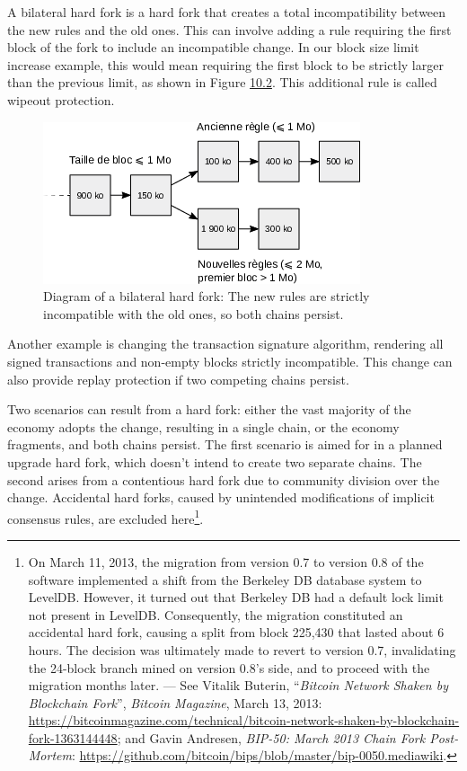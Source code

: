 \documentclass[
  a5paper,
  smalldemyvopaper,10pt,twoside,onecolumn,openright,extrafontsizes,hidelinks]{memoir}
\begin{document}
A bilateral hard fork is a hard fork that creates a total
incompatibility between the new rules and the old ones. This can involve
adding a rule requiring the first block of the fork to include an
incompatible change. In our block size limit increase example, this
would mean requiring the first block to be strictly larger than the
previous limit, as shown in Figure
\hyperref[fig:expanding-hard-fork-failure]{10.2}. This additional rule
is called wipeout protection.

\begin{figure}

{\centering \includegraphics{chapters/img/bilateral-hard-fork-induced-fork.png}

}

\caption{Diagram of a bilateral hard fork: The new rules are strictly
incompatible with the old ones, so both chains persist.}

\end{figure}%

Another example is changing the transaction signature algorithm,
rendering all signed transactions and non-empty blocks strictly
incompatible. This change can also provide replay protection if two
competing chains persist.

Two scenarios can result from a hard fork: either the vast majority of
the economy adopts the change, resulting in a single chain, or the
economy fragments, and both chains persist. The first scenario is aimed
for in a planned upgrade hard fork, which doesn't intend to create two
separate chains. The second arises from a contentious hard fork due to
community division over the change. Accidental hard forks, caused by
unintended modifications of implicit consensus rules, are excluded
here\footnote{On March 11, 2013, the migration from version 0.7 to
  version 0.8 of the software implemented a shift from the Berkeley DB
  database system to LevelDB. However, it turned out that Berkeley DB
  had a default lock limit not present in LevelDB. Consequently, the
  migration constituted an accidental hard fork, causing a split from
  block 225,430 that lasted about 6 hours. The decision was ultimately
  made to revert to version 0.7, invalidating the 24-block branch mined
  on version 0.8's side, and to proceed with the migration months later.
  --- See Vitalik Buterin, ``\emph{Bitcoin Network Shaken by Blockchain
  Fork}'', \emph{Bitcoin Magazine}, March 13, 2013:
  \url{https://bitcoinmagazine.com/technical/bitcoin-network-shaken-by-blockchain-fork-1363144448};
  and Gavin Andresen, \emph{BIP-50: March 2013 Chain Fork Post-Mortem}:
  \url{https://github.com/bitcoin/bips/blob/master/bip-0050.mediawiki}.}.
\end{document}
